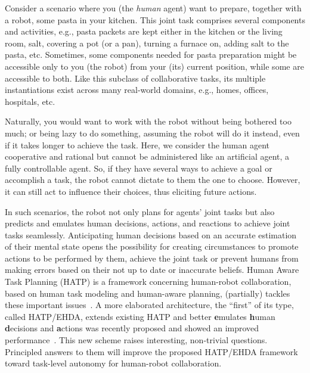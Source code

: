 \documentclass[letterpaper]{article} %
\begin{document}
Consider a scenario where you (the \textit{human} agent) want to prepare, together with a robot, some pasta in your kitchen. This joint task comprises several components and activities, e.g., pasta packets are kept either in the kitchen or the living room, salt, covering a pot (or a pan), turning a furnace on, adding salt to the pasta, etc. 
Sometimes, some components needed for pasta preparation might be accessible only to you (the robot) from your (its) current position, while some are accessible to both. 
Like this subclass of collaborative tasks, its multiple instantiations exist across many real-world domains, e.g., homes, offices, hospitals, etc.

Naturally, you would want to work with the robot without being bothered too much; or being lazy to do something, assuming the robot will do it instead, even if it takes longer to achieve the task. Here, we consider the human agent cooperative and rational but cannot be administered like an artificial agent, a fully controllable agent. 
So, if they have several ways to achieve a goal or accomplish a task, the robot cannot dictate to them the one to choose. However, it can still act to influence their choices, thus eliciting future actions. 

In such scenarios, the robot not only plans for agents' joint tasks but also predicts and emulates human decisions, actions, and reactions to achieve joint tasks seamlessly. 
Anticipating human decisions based on an accurate estimation of their mental state opens the possibility for creating circumstances to promote actions to be performed by them, achieve the joint task or prevent humans from making errors based on their not up to date or inaccurate beliefs.
Human Aware Task Planning (HATP) is a framework concerning human-robot collaboration, based on human task modeling and human-aware planning, (partially) tackles these important issues~\cite{alami2006toward,alili2009planning,de2015hatp,lallement2018hatp}.
A more elaborated architecture, the ``first'' of its type, called HATP/EHDA, extends existing HATP and better \textbf{e}mulates \textbf{h}uman \textbf{d}ecisions and \textbf{a}ctions was recently proposed and showed an improved performance~\cite{BuisanA21,buisan:hal-03684211}.
This new scheme raises interesting, non-trivial questions. Principled answers to them will improve the proposed HATP/EHDA framework toward task-level autonomy for human-robot collaboration.
\end{document}
